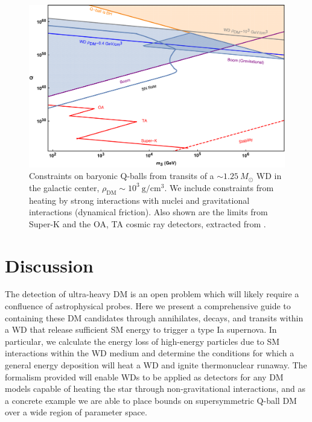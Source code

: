 \documentclass[twocolumn, preprintnumbers,amsmath,amssymb,prd, superscriptaddress]{revtex4}
\begin{document}
\begin{figure}
\includegraphics[scale=.3]{Qballconstraint.pdf}
\caption{Constraints on baryonic Q-balls from transits of a $\sim 1.25 ~M_{\odot}$ WD in the galactic center, $\rho_\text{DM} \sim 10^3 ~\text{g}/\text{cm}^3$.
We include constraints from heating by strong interactions with nuclei and gravitational interactions (dynamical friction).
Also shown are the limits from Super-K and the OA, TA cosmic ray detectors, extracted from \cite{Dine:2003ax}.}
\label{fig:Qballconstraint}
\end{figure}

\section{Discussion}
\label{sec:Discussion}

The detection of ultra-heavy DM is an open problem which will likely require a confluence of astrophysical probes.
Here we present a comprehensive guide to containing these DM candidates through annihilates, decays, and transits within a WD that release sufficient SM energy to trigger a type Ia supernova.
In particular, we calculate the energy loss of high-energy particles due to SM interactions within the WD medium and determine the conditions for which a general energy deposition will heat a WD and ignite thermonuclear runaway.
The formalism provided will enable WDs to be applied as detectors for any DM models capable of heating the star through non-gravitational interactions, and as a concrete example we are able to place bounds on supersymmetric Q-ball DM over a wide region of parameter space.
\end{document}
